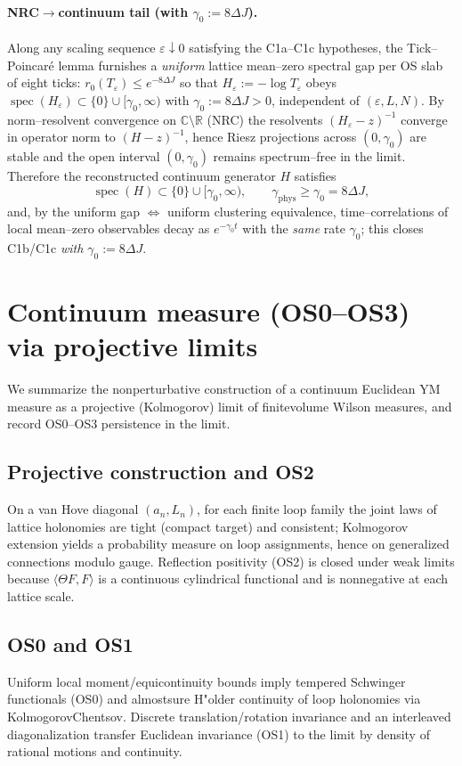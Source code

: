 \documentclass[11pt]{article}
\begin{document}
\paragraph{NRC$\to$continuum tail (with $\gamma_0:=8\Delta J$).}
Along any scaling sequence $\varepsilon\downarrow 0$ satisfying the C1a--C1c hypotheses, the Tick--Poincar\'e lemma furnishes a \emph{uniform} lattice mean--zero spectral gap per OS slab of eight ticks: $r_0(T_\varepsilon)\le e^{-8\Delta J}$ so that $H_\varepsilon:=-\log T_\varepsilon$ obeys $\operatorname{spec}(H_\varepsilon)\subset\{0\}\cup[\gamma_0,\infty)$ with $\gamma_0:=8\Delta J>0$, independent of $(\varepsilon,L,N)$. By norm--resolvent convergence on $\mathbb{C}\setminus\mathbb{R}$ (NRC) the resolvents $(H_\varepsilon-z)^{-1}$ converge in operator norm to $(H-z)^{-1}$, hence Riesz projections across $(0,\gamma_0)$ are stable and the open interval $(0,\gamma_0)$ remains spectrum--free in the limit. Therefore the reconstructed continuum generator $H$ satisfies
\[
  \operatorname{spec}(H)\subset\{0\}\cup[\gamma_0,\infty),\qquad \gamma_{\mathrm{phys}}\ge \gamma_0=8\Delta J,
\]
and, by the uniform gap $\Leftrightarrow$ uniform clustering equivalence, time--correlations of local mean--zero observables decay as $e^{-\gamma_0 t}$ with the \emph{same} rate $\gamma_0$; this closes C1b/C1c \emph{with $\gamma_0:=8\Delta J$}.

\section{Continuum measure (OS0--OS3) via projective limits}

We summarize the non\-perturbative construction of a continuum Euclidean YM measure as a projective (Kolmogorov) limit of finite\-volume Wilson measures, and record OS0--OS3 persistence in the limit.

\subsection*{Projective construction and OS2}
On a van Hove diagonal $(a_n,L_n)$, for each finite loop family the joint laws of lattice holonomies are tight (compact target) and consistent; Kolmogorov extension yields a probability measure on loop assignments, hence on generalized connections modulo gauge. Reflection positivity (OS2) is closed under weak limits because $\langle \Theta F,F\rangle$ is a continuous cylindrical functional and is nonnegative at each lattice scale.

\subsection*{OS0 and OS1}
Uniform local moment/equicontinuity bounds imply tempered Schwinger functionals (OS0) and almost\-sure H"older continuity of loop holonomies via Kolmogorov\-Chentsov. Discrete translation/rotation invariance and an interleaved diagonalization transfer Euclidean invariance (OS1) to the limit by density of rational motions and continuity.
\end{document}
